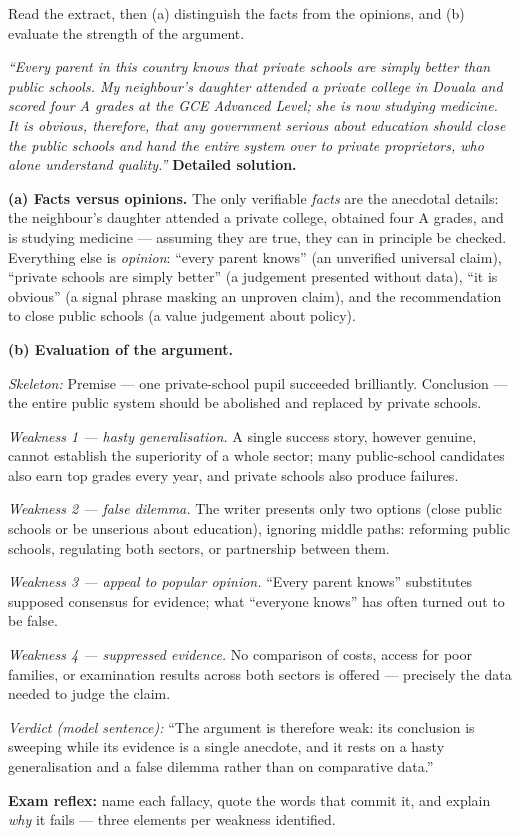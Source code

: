 \documentclass[11pt]{article}
\begin{document}
\begin{exoresolu}
Read the extract, then (a) distinguish the facts from the opinions, and (b) evaluate the strength of the argument.

\emph{``Every parent in this country knows that private schools are simply better than public schools. My neighbour's daughter attended a private college in Douala and scored four A grades at the GCE Advanced Level; she is now studying medicine. It is obvious, therefore, that any government serious about education should close the public schools and hand the entire system over to private proprietors, who alone understand quality.''}
\tcblower
\textbf{Detailed solution.}

\textbf{(a) Facts versus opinions.} The only verifiable \emph{facts} are the anecdotal details: the neighbour's daughter attended a private college, obtained four A grades, and is studying medicine — assuming they are true, they can in principle be checked. Everything else is \emph{opinion}: ``every parent knows'' (an unverified universal claim), ``private schools are simply better'' (a judgement presented without data), ``it is obvious'' (a signal phrase masking an unproven claim), and the recommendation to close public schools (a value judgement about policy).

\textbf{(b) Evaluation of the argument.}

\emph{Skeleton:} Premise — one private-school pupil succeeded brilliantly. Conclusion — the entire public system should be abolished and replaced by private schools.

\emph{Weakness 1 — hasty generalisation.} A single success story, however genuine, cannot establish the superiority of a whole sector; many public-school candidates also earn top grades every year, and private schools also produce failures.

\emph{Weakness 2 — false dilemma.} The writer presents only two options (close public schools or be unserious about education), ignoring middle paths: reforming public schools, regulating both sectors, or partnership between them.

\emph{Weakness 3 — appeal to popular opinion.} ``Every parent knows'' substitutes supposed consensus for evidence; what ``everyone knows'' has often turned out to be false.

\emph{Weakness 4 — suppressed evidence.} No comparison of costs, access for poor families, or examination results across both sectors is offered — precisely the data needed to judge the claim.

\emph{Verdict (model sentence):} ``The argument is therefore weak: its conclusion is sweeping while its evidence is a single anecdote, and it rests on a hasty generalisation and a false dilemma rather than on comparative data.''

\textbf{Exam reflex:} name each fallacy, quote the words that commit it, and explain \emph{why} it fails — three elements per weakness identified.
\end{exoresolu}
\end{document}
